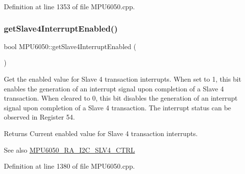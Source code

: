 Definition at line 1353 of file M\+P\+U6050.\+cpp.


\begin{DoxyCode}{0}

\end{DoxyCode}
\mbox{\label{classMPU6050_a051549bcfa2eeb848c8557fc3efe74da}} 
\subsubsection{\texorpdfstring{getSlave4InterruptEnabled()}{getSlave4InterruptEnabled()}}
{\footnotesize\ttfamily bool M\+P\+U6050\+::get\+Slave4\+Interrupt\+Enabled (\begin{DoxyParamCaption}{ }\end{DoxyParamCaption})}

Get the enabled value for Slave 4 transaction interrupts. When set to 1, this bit enables the generation of an interrupt signal upon completion of a Slave 4 transaction. When cleared to 0, this bit disables the generation of an interrupt signal upon completion of a Slave 4 transaction. The interrupt status can be observed in Register 54.

\begin{DoxyReturn}{Returns}
Current enabled value for Slave 4 transaction interrupts. 
\end{DoxyReturn}
\begin{DoxySeeAlso}{See also}
\mbox{\hyperlink{MPU6050_8h_a2b6fbfceb145ba1c8b19f51475fd7a5d}{M\+P\+U6050\+\_\+\+R\+A\+\_\+\+I2\+C\+\_\+\+S\+L\+V4\+\_\+\+C\+T\+RL}} 
\end{DoxySeeAlso}


Definition at line 1380 of file M\+P\+U6050.\+cpp.


